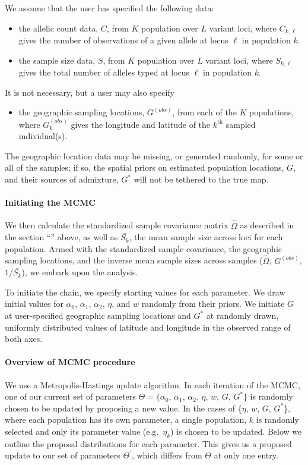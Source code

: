 \documentclass[10pt,letterpaper]{article}
\newcommand{\identifyadmixsource}[1]{{#1^{*}}}
\newcommand{\secref}[1]{``\nameref{#1}''}
\begin{document}
We assume that the user has specified the following data: 
\begin{itemize}
\item the allelic count data, $C$, from $K$ population over $L$ variant loci, where $C_{k,\ell}$ gives the number of observations of a given allele at locus $\ell$ in population $k$. 
\item the sample size data, $S$, from $K$ population over $L$ variant loci, where $S_{k,\ell}$ gives the total number of alleles typed at locus $\ell$ in population $k$.
\end{itemize}

It is not necessary, but a user may also specify 
\begin{itemize}
  \item the geographic sampling locations, $G^{(obs)}$, from each of the $K$ populations, where $G^{(obs)}_k$ gives the longitude and latitude of the $k^\mathrm{th}$ sampled individual(s).
\end{itemize}

The geographic location data may be missing, or generated randomly, for some or all of the samples; if so, the spatial priors on estimated population locations, $G$, and their sources of admixture, $\identifyadmixsource{G}$ will not be tethered to the true map. 

\paragraph{Initiating the MCMC}
We then calculate the standardized sample covariance matrix $\widehat{\Omega}$ as described in the section \secref{ss:cov_methods} above,
as well as $\bar{S_k}$, the mean sample size across loci for each population.
Armed with the standardized sample covariance, the geographic sampling locations, and the inverse mean sample sizes across samples ($\widehat{\Omega}$, $G^{(obs)}$, $1/\bar{S_k}$), we embark upon the analysis.

To initiate the chain, we specify starting values for each parameter.  We draw initial values for $\alpha_0$, $\alpha_1$, $\alpha_2$, $\eta$, and $w$ randomly from their priors.  We initiate $G$ at user-specified geographic sampling locations and $\identifyadmixsource{G}$ at randomly drawn, uniformly distributed values of latitude and longitude in the observed range of both axes.  

\paragraph{Overview of MCMC procedure}
We use a Metropolis-Hastings update algorithm. 
In each iteration of the MCMC, one of our current set of parameters 
$\Theta= \{\alpha_0$, $\alpha_1$, $\alpha_2$, $\eta$, $w$, $G$, $\identifyadmixsource{G}\}$ 
is randomly chosen to be updated by proposing a new value.  
In the cases of \{$\eta$, $w$, $G$, $\identifyadmixsource{G}$\}, where each population has its own parameter, a single population, $k$ 
is randomly selected and only its parameter value (e.g.\ $\eta_k$) is chosen to be updated. 
Below we outline the proposal distributions for each parameter. 
This gives us a proposed update to our set of parameters $\Theta^{\prime}$, which differs from $\Theta$ at only one entry.
\end{document}
